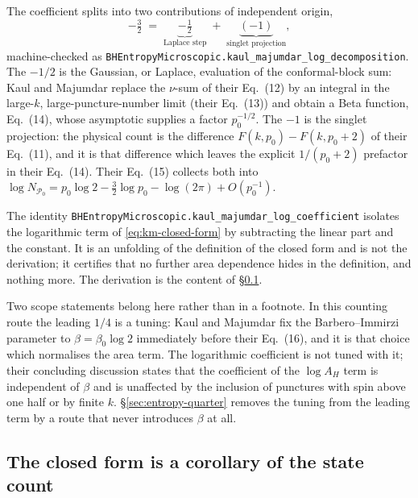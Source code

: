 \documentclass[aps,prd,nofootinbib,superscriptaddress,12pt]{revtex4-2}
\DeclareRobustCommand{\lb}{\discretionary{}{}{}}
\begin{document}
The coefficient splits into two contributions of independent origin,
\begin{equation}
\label{eq:log-decomposition}
-\tfrac{3}{2} \;=\; \underbrace{-\tfrac{1}{2}}_{\text{Laplace step}} \;+\; \underbrace{(-1)}_{\text{singlet projection}} ,
\end{equation}
machine-checked as
\texttt{BHEntropy\lb{}Microscopic.\lb{}kaul\_\lb{}majumdar\_\lb{}log\_\lb{}decomposition}. The $-1/2$ is the
Gaussian, or Laplace, evaluation of the conformal-block sum: Kaul and Majumdar replace the
$\nu$-sum of their Eq.~(12) by an integral in the large-$k$, large-puncture-number limit
(their Eq.~(13)) and obtain a Beta function, Eq.~(14), whose asymptotic supplies a factor
$p_0^{-1/2}$. The $-1$ is the singlet projection: the physical count is the difference
$F(k,p_0) - F(k,p_0+2)$ of their Eq.~(11), and it is that difference which leaves the
explicit $1/(p_0+2)$ prefactor in their Eq.~(14). Their Eq.~(15) collects both into
$\log N_{\mathcal{P}_0} = p_0\log 2 - \tfrac{3}{2}\log p_0 - \log(2\pi) + O(p_0^{-1})$.

The identity \texttt{BHEntropy\lb{}Microscopic.\lb{}kaul\_\lb{}majumdar\_\lb{}log\_\lb{}coefficient} isolates the
logarithmic term of \eqref{eq:km-closed-form} by subtracting the linear part and the
constant. It is an unfolding of the definition of the closed form and is not the
derivation; it certifies that no further area dependence hides in the definition, and
nothing more. The derivation is the content of \S\ref{sec:entropy-count}.

Two scope statements belong here rather than in a footnote. In this counting route the
leading $1/4$ is a tuning: Kaul and Majumdar fix the Barbero--Immirzi parameter to
$\beta = \beta_0\log 2$ immediately before their Eq.~(16), and it is that choice which
normalises the area term. The logarithmic coefficient is not tuned with it; their
concluding discussion states that the coefficient of the $\log A_H$ term is independent of
$\beta$ and is unaffected by the inclusion of punctures with spin above one half or by
finite $k$. \S\ref{sec:entropy-quarter} removes the tuning from the leading term by a
route that never introduces $\beta$ at all.

\subsection{The closed form is a corollary of the state count}
\label{sec:entropy-count}
\end{document}
